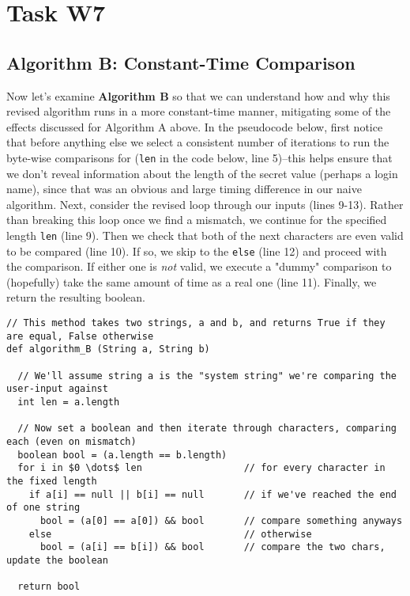 \documentclass{article}
\providecommand{\inlinecode}{\texttt}
\begin{document}
\pagebreak

\section{Task W7}
\subsection{Algorithm B: Constant-Time Comparison}
Now let's examine \textbf{Algorithm B} so that we can understand how and why this revised algorithm runs in a more constant-time manner, mitigating some of the effects discussed for Algorithm A above.
In the pseudocode below, first notice that before anything else we select a consistent number of iterations to run the byte-wise comparisons for (\inlinecode{len} in the code below, line 5)--this helps ensure that we don't reveal information about the length of the secret value (perhaps a login name), since that was an obvious and large timing difference in our naive algorithm.
Next, consider the revised loop through our inputs (lines 9-13). Rather than breaking this loop once we find a mismatch, we continue for the specified length \inlinecode{len} (line 9).
Then we check that both of the next characters are even valid to be compared (line 10). If so, we skip to the \inlinecode{else} (line 12) and proceed with the comparison. If either one is \textit{not} valid, we execute a "dummy" comparison to (hopefully) take the same amount of time as a real one (line 11).
Finally, we return the resulting boolean.

\begin{lstlisting}
// This method takes two strings, a and b, and returns True if they are equal, False otherwise
def algorithm_B (String a, String b)

  // We'll assume string a is the "system string" we're comparing the user-input against
  int len = a.length

  // Now set a boolean and then iterate through characters, comparing each (even on mismatch)
  boolean bool = (a.length == b.length)
  for i in $0 \dots$ len                  // for every character in the fixed length
    if a[i] == null || b[i] == null       // if we've reached the end of one string
      bool = (a[0] == a[0]) && bool       // compare something anyways
    else                                  // otherwise
      bool = (a[i] == b[i]) && bool       // compare the two chars, update the boolean

  return bool
\end{lstlisting}
\end{document}
